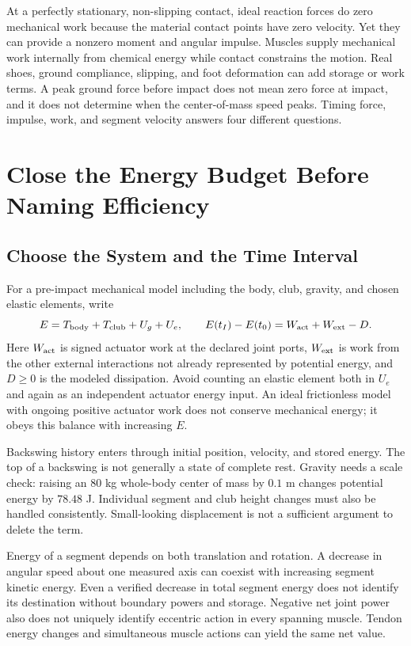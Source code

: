 At a perfectly stationary, non-slipping contact, ideal reaction forces do zero mechanical work because the material contact points have zero velocity. Yet they can provide a nonzero moment and angular impulse. Muscles supply mechanical work internally from chemical energy while contact constrains the motion. Real shoes, ground compliance, slipping, and foot deformation can add storage or work terms. A peak ground force before impact does not mean zero force at impact, and it does not determine when the center-of-mass speed peaks. Timing force, impulse, work, and segment velocity answers four different questions.

\section{Close the Energy Budget Before Naming Efficiency}
\subsection{Choose the System and the Time Interval}
For a pre-impact mechanical model including the body, club, gravity, and chosen elastic elements, write
\begin{equation}
E=T_{\rm body}+T_{\rm club}+U_g+U_e,\qquad
E(t_I)-E(t_0)=W_{\rm act}+W_{\rm ext}-D.
\end{equation}
Here $W_{\rm act}$ is signed actuator work at the declared joint ports, $W_{\rm ext}$ is work from the other external interactions not already represented by potential energy, and $D\ge0$ is the modeled dissipation. Avoid counting an elastic element both in $U_e$ and again as an independent actuator energy input. An ideal frictionless model with ongoing positive actuator work does not conserve mechanical energy; it obeys this balance with increasing $E$.

Backswing history enters through initial position, velocity, and stored energy. The top of a backswing is not generally a state of complete rest. Gravity needs a scale check: raising an 80 kg whole-body center of mass by $0.1$ m changes potential energy by $78.48$ J. Individual segment and club height changes must also be handled consistently. Small-looking displacement is not a sufficient argument to delete the term.

Energy of a segment depends on both translation and rotation. A decrease in angular speed about one measured axis can coexist with increasing segment kinetic energy. Even a verified decrease in total segment energy does not identify its destination without boundary powers and storage. Negative net joint power also does not uniquely identify eccentric action in every spanning muscle. Tendon energy changes and simultaneous muscle actions can yield the same net value.

